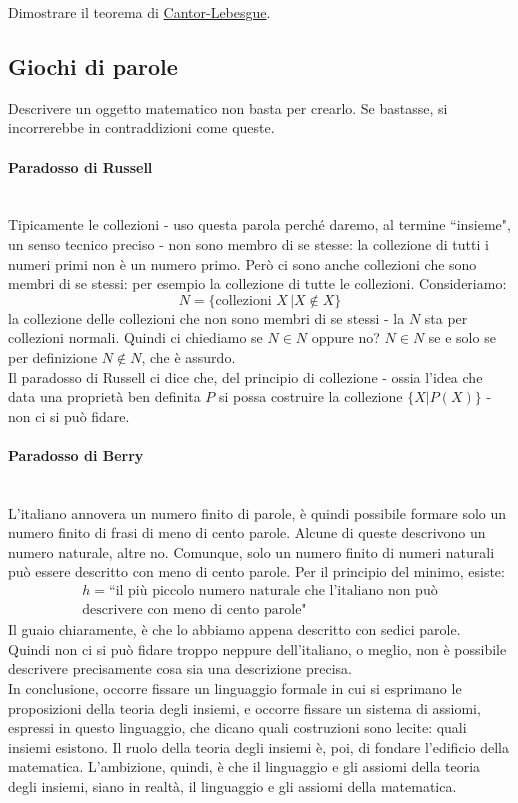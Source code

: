 \documentclass[11pt]{scrartcl}
\begin{document}
\begin{exercise}
Dimostrare il teorema di \hyperref[CL]{Cantor-Lebesgue}.
\end{exercise}

\subsection{Giochi di parole}
Descrivere un oggetto matematico non basta per crearlo. Se bastasse, si incorrerebbe in contraddizioni come queste.
\paragraph*{Paradosso di Russell}\mbox{}\\
Tipicamente le collezioni - uso questa parola perché daremo, al termine ``insieme", un senso tecnico preciso - non sono membro di se stesse: la collezione di 
tutti i numeri primi non è un numero primo. Però ci sono anche collezioni che sono membri di se stessi: per esempio la collezione di tutte le collezioni. Consideriamo:
\[ N = \{\text{collezioni $X$}\, | X \not\in X \}
	\]
la collezione delle collezioni che non sono membri di se stessi - la $N$ sta per collezioni normali. Quindi ci chiediamo se $N \in N$ oppure no? $N \in N$ se e solo se per definizione $N \not \in N$, che è assurdo.\\
Il paradosso di Russell ci dice che, del principio di collezione - ossia l'idea che data una proprietà ben definita $P$ si possa costruire la collezione $\{X | P(X)\}$ - non ci si può fidare.

\paragraph*{Paradosso di Berry}\mbox{}\\
L'italiano annovera un numero finito di parole, è quindi possibile formare solo un numero finito di frasi di meno di cento parole. Alcune di queste descrivono un numero naturale, altre no. Comunque, solo un numero 
finito di numeri naturali può essere descritto con meno di cento parole. Per il principio del minimo, esiste:
\begin{align*}
	h = \text{``il più piccolo numero naturale che l'italiano non può} \\ 
 \text{descrivere con meno di cento parole"}
\end{align*}
Il guaio chiaramente, è che lo abbiamo appena descritto con sedici parole.\\
Quindi non ci si può fidare troppo neppure dell'italiano, o meglio, non è possibile descrivere precisamente cosa sia una descrizione precisa.\\
In conclusione, occorre fissare un linguaggio formale in cui si esprimano le proposizioni della teoria degli insiemi, e occorre fissare un sistema di assiomi, espressi in questo linguaggio, che 
dicano quali costruzioni sono lecite: quali insiemi esistono. Il ruolo della teoria degli insiemi è, poi, di fondare l'edificio della matematica. L'ambizione, quindi, è che il linguaggio e gli assiomi della teoria degli insiemi, 
siano in realtà, il linguaggio e gli assiomi della matematica.
\end{document}
